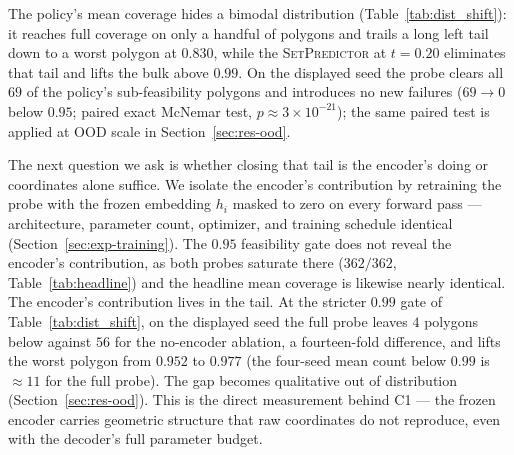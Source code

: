\documentclass[preprint,10pt]{elsarticle}
\newcommand{\Covf}[1]{\mathrm{Cov}_P(#1)}
\newcommand{\SetPredictor}{\textup{\textsc{SetPredictor}}}
\newcommand{\cfeas}{0.95} %
\begin{document}
\begin{table}[t]
  \centering
  \small
  \resizebox{\textwidth}{!}{}
  \caption{Per-polygon coverage distribution on \texttt{test} ($362$ polygons). Counts show the number of polygons reaching each coverage threshold; \emph{min} $\Covf{S}$ is the worst polygon. The pretrained policy has a long left tail; the \SetPredictor{} moves the entire distribution to the right. This is the table that exposes the encoder's contribution: at the $0.95$ gate both probes saturate ($362/362$), so the separation shows only at the stricter $0.99$/$0.999$ gates and in $\min\Covf{S}$. At $t=0.20$ the full probe leaves $4$ polygons below $0.99$ against $56$ for the no-encoder ablation (the matched-capacity control of Section~\ref{sec:res-headline-ablation}), and lifts the worst polygon from $0.952$ to $0.977$. The \emph{full} rows and the no-encoder row are the displayed seed ($1234$); Table~\ref{tab:headline} reports the four-seed mean$\pm$std for the full probe at $t=0.20$.}
  \label{tab:dist_shift}
\end{table}

The policy's mean coverage hides a bimodal distribution (Table~\ref{tab:dist_shift}): it reaches full coverage on only a handful of polygons and trails a long left tail down to a worst polygon at $0.830$, while the \SetPredictor{} at $t = 0.20$ eliminates that tail and lifts the bulk above $0.99$. On the displayed seed the probe clears all $69$ of the policy's sub-feasibility polygons and introduces no new failures ($69 \to 0$ below $\cfeas$; paired exact McNemar test, $p \approx 3 \times 10^{-21}$); the same paired test is applied at OOD scale in Section~\ref{sec:res-ood}.

The next question we ask is whether closing that tail is the encoder's doing or coordinates alone suffice. We isolate the encoder's contribution by retraining the probe with the frozen embedding $h_i$ masked to zero on every forward pass --- architecture, parameter count, optimizer, and training schedule identical (Section~\ref{sec:exp-training}). The $0.95$ feasibility gate does not reveal the encoder's contribution, as both probes saturate there ($362/362$, Table~\ref{tab:headline}) and the headline mean coverage is likewise nearly identical. The encoder's contribution lives in the tail. At the stricter $0.99$ gate of Table~\ref{tab:dist_shift}, on the displayed seed the full probe leaves $4$ polygons below against $56$ for the no-encoder ablation, a fourteen-fold difference, and lifts the worst polygon from $0.952$ to $0.977$ (the four-seed mean count below $0.99$ is $\approx 11$ for the full probe). The gap becomes qualitative out of distribution (Section~\ref{sec:res-ood}). This is the direct measurement behind C1 --- the frozen encoder carries geometric structure that raw coordinates do not reproduce, even with the decoder's full parameter budget.
\end{document}
